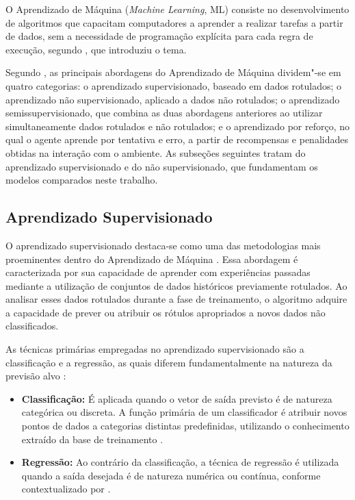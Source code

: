 \documentclass{uflamon}          %
\begin{document}
O Aprendizado de Máquina (\textit{Machine Learning}, ML) consiste no desenvolvimento de algoritmos que capacitam computadores a aprender a realizar tarefas a partir de dados, sem a necessidade de programação explícita para cada regra de execução, segundo , que introduziu o tema.

Segundo , as principais abordagens do Aprendizado de Máquina dividem"-se em quatro categorias: o aprendizado supervisionado, baseado em dados rotulados; o aprendizado não supervisionado, aplicado a dados não rotulados; o aprendizado semissupervisionado, que combina as duas abordagens anteriores ao utilizar simultaneamente dados rotulados e não rotulados; e o aprendizado por reforço, no qual o agente aprende por tentativa e erro, a partir de recompensas e penalidades obtidas na interação com o ambiente. As subseções seguintes tratam do aprendizado supervisionado e do não supervisionado, que fundamentam os modelos comparados neste trabalho.

\subsection{Aprendizado Supervisionado}

O aprendizado supervisionado destaca-se como uma das metodologias mais proeminentes dentro do Aprendizado de Máquina \cite{bzdok2018}. Essa abordagem é caracterizada por sua capacidade de aprender com experiências passadas mediante a utilização de conjuntos de dados históricos previamente rotulados. Ao analisar esses dados rotulados durante a fase de treinamento, o algoritmo adquire a capacidade de prever ou atribuir os rótulos apropriados a novos dados não classificados.

As técnicas primárias empregadas no aprendizado supervisionado são a classificação e a regressão, as quais diferem fundamentalmente na natureza da previsão alvo \cite{bzdok2018}:

\begin{itemize}
    \item \textbf{Classificação:} É aplicada quando o vetor de saída previsto é de natureza categórica ou discreta. A função primária de um classificador é atribuir novos pontos de dados a categorias distintas predefinidas, utilizando o conhecimento extraído da base de treinamento \cite{gopal2018}.
    \item \textbf{Regressão:} Ao contrário da classificação, a técnica de regressão é utilizada quando a saída desejada é de natureza numérica ou contínua, conforme contextualizado por .
\end{itemize}
\end{document}
